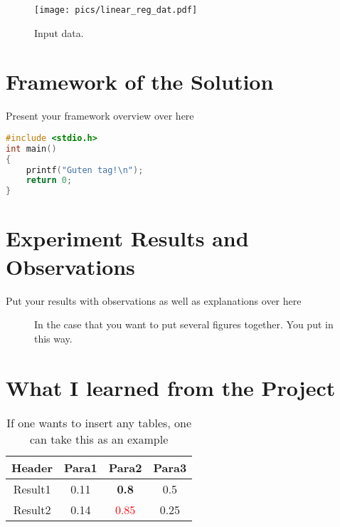 \documentclass[12pt]{article}
\begin{document}
\begin{figure}
	\centering
	\texttt{[image: pics/linear\_reg\_dat.pdf]}
	\caption{Input data.}
\end{figure}

\section{Framework of the Solution}
Present your framework overview over here

%
\begin{lstlisting}[language=c, linewidth=0.8\linewidth, caption={Put your code here if necessary}]
#include <stdio.h>
int main()
{
    printf("Guten tag!\n");
    return 0;
}
\end{lstlisting}

\section{Experiment Results and Observations}
Put your results with observations as well as explanations over here

\begin{figure}[b]
	\centering
	\hspace{0.15in}
	\caption{In the case that you want to put several figures together. You put in this way.}
\end{figure}

\section{What I learned from the Project}
\begin{table}
\caption{If one wants to insert any tables, one can take this as an example}
\begin{center}
	\begin{tabular}{|c|c|c|c|}
	\hline
	Header & Para1 & Para2 & Para3 \\ \hline
	Result1 & 0.11 & \textbf{0.8} & 0.5 \\ \hline
	Result2 & 0.14 & \textcolor{red}{0.85} & 0.25 \\ \hline
	\end{tabular}
\end{center}
\end{table}
\end{document}
